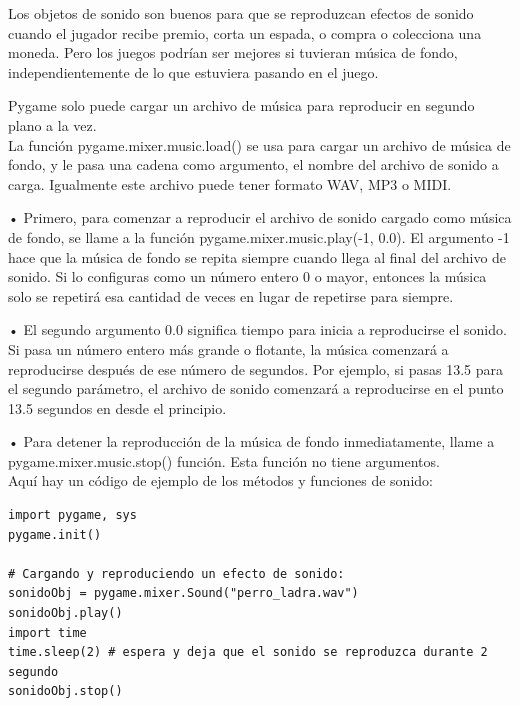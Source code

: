 Los objetos de sonido son buenos para que se reproduzcan efectos de sonido cuando el jugador recibe premio, corta un
espada, o compra o colecciona una moneda. Pero los juegos podrían ser mejores si tuvieran música de fondo, 
independientemente de lo que estuviera pasando en el juego.

Pygame solo puede cargar un archivo de música para reproducir en segundo plano a la vez.\\ 

La función {\ttfamily pygame.mixer.music.load()} se usa para cargar un archivo de música de fondo, 
y le pasa una  cadena  como  argumento, el nombre del archivo de sonido a carga. Igualmente este 
archivo puede tener formato WAV, MP3 o MIDI.

• Primero, para comenzar a reproducir el archivo de sonido cargado como música de fondo, se llame a la función 
{\ttfamily pygame.mixer.music.play(-1, 0.0)}. El argumento -1 hace que la música de fondo se repita
siempre cuando llega al final del archivo de sonido. Si lo configuras como un número entero
0 o mayor, entonces la música solo se repetirá esa cantidad de veces en lugar de repetirse para siempre. 

• El segundo argumento  0.0 significa tiempo para inicia a reproducirse el sonido. Si pasa un número entero más grande o flotante,
la música comenzará a reproducirse después de ese número de segundos. Por ejemplo, si pasas 13.5 para el segundo parámetro, 
el archivo de sonido comenzará a reproducirse en el punto 13.5 segundos en desde el principio.

• Para detener la reproducción de la música de fondo inmediatamente, llame a pygame.mixer.music.stop()
función. Esta función no tiene argumentos.\\

Aquí hay un código de ejemplo de los métodos y funciones de sonido:

\hspace{-2.9cm}{\ttfamily \scriptsize musica}

\vspace{-0.2cm}
\hspace{-2.5cm}{\ttfamily \scriptsize \_fondo.py}\vspace{-0.84cm}
\begin{lstlisting}		
import pygame, sys
pygame.init()

# Cargando y reproduciendo un efecto de sonido:
sonidoObj = pygame.mixer.Sound("perro_ladra.wav")    
sonidoObj.play()
import time
time.sleep(2) # espera y deja que el sonido se reproduzca durante 2 segundo
sonidoObj.stop()
\end{lstlisting}

